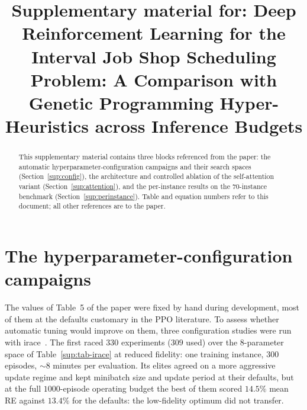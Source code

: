 \documentclass[preprint,12pt]{elsarticle}
\begin{document}
\begin{frontmatter}

\title{Supplementary material for: Deep Reinforcement Learning for
the Interval Job Shop Scheduling Problem: A Comparison with Genetic
Programming Hyper-Heuristics across Inference Budgets}

\begin{abstract}
This supplementary material contains three blocks
referenced from the paper: the automatic
hyperparameter-configuration campaigns and their search spaces
(Section~\ref{sup:config}), the architecture and controlled ablation
of the self-attention variant (Section~\ref{sup:attention}), and the
per-instance results on the 70-instance benchmark
(Section~\ref{sup:perinstance}). Table and equation numbers refer to
this document; all other references are to the paper.
\end{abstract}

\end{frontmatter}

\section{The hyperparameter-configuration campaigns}
\label{sup:config}

The values of Table~5 of the paper were fixed by hand during
development, most of them at the defaults customary in the PPO
literature. To assess whether automatic tuning would improve on them,
three configuration studies were run with
irace~\citep{LopezIbanez2016}. The first raced $330$ experiments
($309$ used) over the 8-parameter space of Table~\ref{sup:tab-irace}
at reduced fidelity: one training instance, $300$ episodes,
${\sim}8$ minutes per evaluation. Its elites agreed on a more
aggressive update regime and kept minibatch size and update period at
their defaults, but at the full $1000$-episode operating budget the
best of them scored $14.5\%$ mean RE against $13.4\%$ for the
defaults: the low-fidelity optimum did not transfer.
\end{document}
